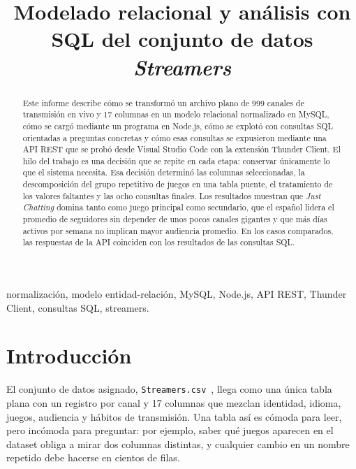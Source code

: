 \documentclass[conference]{IEEEtran}
\begin{document}
\title{Modelado relacional y análisis con SQL del conjunto de datos \emph{Streamers}}

\author{
\and
{}
\and
{}
\and
{}
}

\maketitle

\begin{abstract}
Este informe describe cómo se transformó un archivo plano de 999 canales de transmisión en vivo y 17 columnas en un modelo relacional normalizado en MySQL, cómo se cargó mediante un programa en Node.js, cómo se explotó con consultas SQL orientadas a preguntas concretas y cómo esas consultas se expusieron mediante una API REST que se probó desde Visual Studio Code con la extensión Thunder Client. El hilo del trabajo es una decisión que se repite en cada etapa: conservar únicamente lo que el sistema necesita. Esa decisión determinó las columnas seleccionadas, la descomposición del grupo repetitivo de juegos en una tabla puente, el tratamiento de los valores faltantes y las ocho consultas finales. Los resultados muestran que \emph{Just Chatting} domina tanto como juego principal como secundario, que el español lidera el promedio de seguidores sin depender de unos pocos canales gigantes y que más días activos por semana no implican mayor audiencia promedio. En los casos comparados, las respuestas de la API coinciden con los resultados de las consultas SQL.
\end{abstract}

\begin{IEEEkeywords}
normalización, modelo entidad-relación, MySQL, Node.js, API REST, Thunder Client, consultas SQL, streamers.
\end{IEEEkeywords}

\section{Introducción}
El conjunto de datos asignado, \texttt{Streamers.csv}~\cite{dataset}, llega como una única tabla plana con un registro por canal y 17 columnas que mezclan identidad, idioma, juegos, audiencia y hábitos de transmisión. Una tabla así es cómoda para leer, pero incómoda para preguntar: por ejemplo, saber qué juegos aparecen en el dataset obliga a mirar dos columnas distintas, y cualquier cambio en un nombre repetido debe hacerse en cientos de filas.
\end{document}
